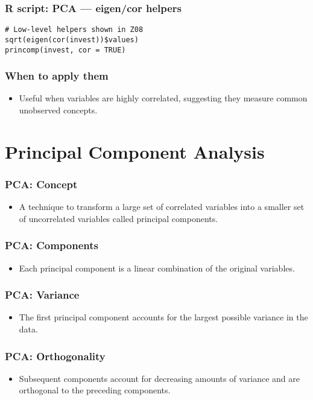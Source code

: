 \documentclass{beamer}
\begin{document}
\begin{frame}[fragile]
    \frametitle{R script: PCA — eigen/cor helpers}
    \begin{verbatim}
# Low-level helpers shown in Z08
sqrt(eigen(cor(invest))$values)
princomp(invest, cor = TRUE)
    \end{verbatim}
\end{frame}

\begin{frame}
    \frametitle{When to apply them}
    \begin{itemize}
        \item Useful when variables are highly correlated, suggesting they measure common unobserved concepts.
    \end{itemize}
\end{frame}

\section{Principal Component Analysis}

\begin{frame}
    \frametitle{PCA: Concept}
    \begin{itemize}
        \item A technique to transform a large set of correlated variables into a smaller set of uncorrelated variables called \alert{principal components}.
    \end{itemize}
\end{frame}

\begin{frame}
    \frametitle{PCA: Components}
    \begin{itemize}
        \item Each principal component is a linear combination of the original variables.
    \end{itemize}
\end{frame}

\begin{frame}
    \frametitle{PCA: Variance}
    \begin{itemize}
        \item The first principal component accounts for the largest possible variance in the data.
    \end{itemize}
\end{frame}

\begin{frame}
    \frametitle{PCA: Orthogonality}
    \begin{itemize}
        \item Subsequent components account for decreasing amounts of variance and are \alert{orthogonal} to the preceding components.
    \end{itemize}
\end{frame}
\end{document}

